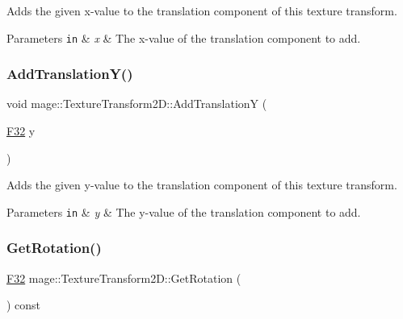 Adds the given x-\/value to the translation component of this texture transform.


\begin{DoxyParams}[1]{Parameters}
\mbox{\tt in}  & {\em x} & The x-\/value of the translation component to add. \\
\hline
\end{DoxyParams}
\mbox{\label{classmage_1_1_texture_transform2_d_a43bf286ed51f622fd9062c5f3f1774ed}} 
\subsubsection{\texorpdfstring{Add\+Translation\+Y()}{AddTranslationY()}}
{\footnotesize\ttfamily void mage\+::\+Texture\+Transform2\+D\+::\+Add\+TranslationY (\begin{DoxyParamCaption}\item[{\mbox{\hyperlink{namespacemage_aa97e833b45f06d60a0a9c4fc22ae02c0}{F32}}}]{y }\end{DoxyParamCaption})\hspace{0.3cm}{\ttfamily [noexcept]}}

Adds the given y-\/value to the translation component of this texture transform.


\begin{DoxyParams}[1]{Parameters}
\mbox{\tt in}  & {\em y} & The y-\/value of the translation component to add. \\
\hline
\end{DoxyParams}
\mbox{\label{classmage_1_1_texture_transform2_d_a29e076372fa33d75d074aa738d39d359}} 
\subsubsection{\texorpdfstring{Get\+Rotation()}{GetRotation()}}
{\footnotesize\ttfamily \mbox{\hyperlink{namespacemage_aa97e833b45f06d60a0a9c4fc22ae02c0}{F32}} mage\+::\+Texture\+Transform2\+D\+::\+Get\+Rotation (\begin{DoxyParamCaption}{ }\end{DoxyParamCaption}) const\hspace{0.3cm}{\ttfamily [noexcept]}}

